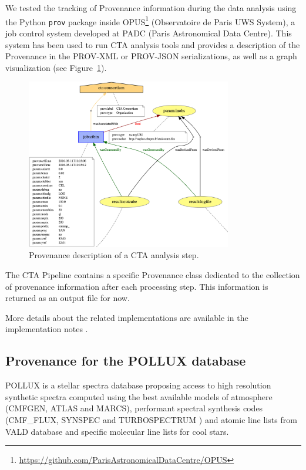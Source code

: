We tested the tracking of Provenance information during the data analysis using the Python \texttt{prov} package inside OPUS\footnote{\url{https://github.com/ParisAstronomicalDataCentre/OPUS}} (Observatoire de Paris UWS System), a job control system developed at PADC (Paris Astronomical Data Centre). This system has been used to run CTA analysis tools and provides a description of the Provenance in the PROV-XML or PROV-JSON serializations, as well as a graph visualization (see Figure~\ref{fig:cta_prov}).

\begin{figure}
\centering
\includegraphics[width=0.8\textwidth]{CTA_prov.png}
\caption{Provenance description of a CTA analysis step.}
\label{fig:cta_prov}
\end{figure}

The CTA Pipeline contains a specific Provenance class dedicated to the collection of provenance information after each processing step. This information is returned as an output file for now.

More details about the related implementations are available in the implementation notes \citep{std:ProvenanceImplementationNote}.


\subsection{Provenance for the POLLUX database}

POLLUX is a stellar spectra database proposing access to high resolution synthetic spectra computed using the best available models of atmosphere (CMFGEN, ATLAS and MARCS), performant spectral synthesis codes (CMF\_FLUX, SYNSPEC and TURBOSPECTRUM ) and atomic line lists from VALD database and specific molecular line lists for cool stars. 

